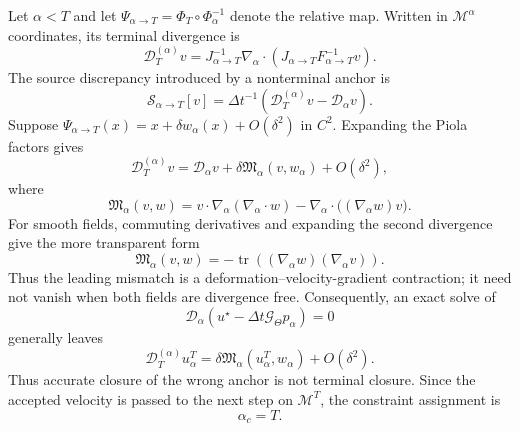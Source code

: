 \documentclass[11pt]{article}
\theoremstyle{plain}
\theoremstyle{definition}
\theoremstyle{remark}
\newcommand{\M}{\mathcal{M}}
\newcommand{\D}{\mathcal{D}}
\newcommand{\G}{\mathcal{G}}
\newcommand{\tr}{\operatorname{tr}}
\newcommand{\dt}{\Delta t}
\newcommand{\Th}{\Theta}
\begin{document}
Let $\alpha<T$ and let
$\Psi_{\alpha\to T}=\Phi_T\circ\Phi_\alpha^{-1}$ denote the relative map.
Written in $\M^\alpha$ coordinates, its terminal divergence is
\begin{equation}
 \D_T^{(\alpha)}v
 =J_{\alpha\to T}^{-1}\nabla_\alpha\cdot
 \left(J_{\alpha\to T}F_{\alpha\to T}^{-1}v\right).
 \label{eq:terminal_divergence_relative}
\end{equation}
The source discrepancy introduced by a nonterminal anchor is
\begin{equation}
  \mathcal S_{\alpha\to T}[v]
  =\dt^{-1}\left(\D_T^{(\alpha)}v-\D_\alpha v\right).
  \label{eq:source_defect_definition}
\end{equation}
Suppose
$\Psi_{\alpha\to T}(x)=x+\delta w_\alpha(x)+O(\delta^2)$ in $C^2$.
Expanding the Piola factors gives
\begin{equation}
 \D_T^{(\alpha)}v
 =\D_\alpha v+\delta\mathfrak M_\alpha(v,w_\alpha)+O(\delta^2),
 \label{eq:source_defect_expansion}
\end{equation}
where
\begin{equation}
 \mathfrak M_\alpha(v,w)
 =v\cdot\nabla_\alpha(\nabla_\alpha\cdot w)
  -\nabla_\alpha\cdot\bigl((\nabla_\alpha w)v\bigr).
 \label{eq:source_defect_leading_term}
\end{equation}
For smooth fields, commuting derivatives and expanding the second divergence
give the more transparent form
\begin{equation}
 \mathfrak M_\alpha(v,w)
 =-\tr\!\left((\nabla_\alpha w)(\nabla_\alpha v)\right).
 \label{eq:source_defect_trace_form}
\end{equation}
Thus the leading mismatch is a deformation--velocity-gradient contraction;
it need not vanish when both fields are divergence free.
Consequently, an exact solve of
\begin{equation}
  \D_\alpha\left(u^\star-\dt\G_\Th p_\alpha\right)=0
  \label{eq:nonterminal_anchor_equation}
\end{equation}
generally leaves
\begin{equation}
 \D_T^{(\alpha)}u_\alpha^T
 =\delta\mathfrak M_\alpha(u_\alpha^T,w_\alpha)+O(\delta^2).
 \label{eq:terminal_residual_after_lagged_solve}
\end{equation}
Thus accurate closure of the wrong anchor is not terminal closure.  Since the
accepted velocity is passed to the next step on $\M^T$, the constraint
assignment is
\begin{equation}
  \boxed{\alpha_c=T.}
  \label{eq:terminal_assignment}
\end{equation}
\end{document}
